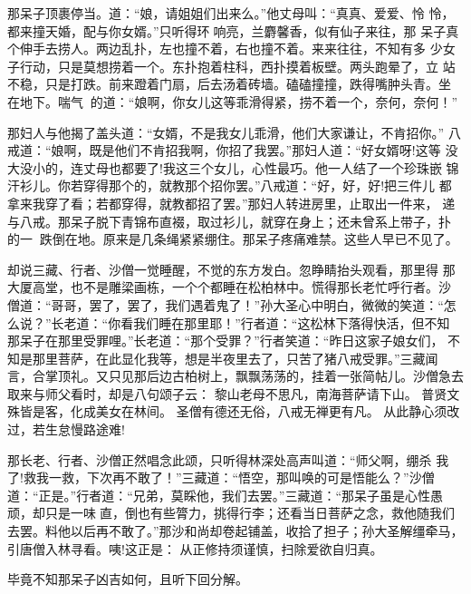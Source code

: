 那呆子顶裹停当。道：“娘，请姐姐们出来么。”他丈母叫：“真真、爱爱、怜
怜，都来撞天婚，配与你女婿。”只听得环响亮，兰麝馨香，似有仙子来往，那
呆子真个伸手去捞人。两边乱扑，左也撞不着，右也撞不着。来来往往，不知有多
少女子行动，只是莫想捞着一个。东扑抱着柱科，西扑摸着板壁。两头跑晕了，立
站不稳，只是打跌。前来蹬着门扇，后去汤着砖墙。磕磕撞撞，跌得嘴肿头青。坐
在地下。喘气的道：“娘啊，你女儿这等乖滑得紧，捞不着一个，奈何，奈何！”

那妇人与他揭了盖头道：“女婿，不是我女儿乖滑，他们大家谦让，不肯招你。”
八戒道：“娘啊，既是他们不肯招我啊，你招了我罢。”那妇人道：“好女婿呀!这等
没大没小的，连丈母也都要了!我这三个女儿，心性最巧。他一人结了一个珍珠嵌
锦汗衫儿。你若穿得那个的，就教那个招你罢。”八戒道：“好，好，好!把三件儿
都拿来我穿了看；若都穿得，就教都招了罢。”那妇人转进房里，止取出一件来，
递与八戒。那呆子脱下青锦布直裰，取过衫儿，就穿在身上；还未曾系上带子，扑
的一，跌倒在地。原来是几条绳紧紧绷住。那呆子疼痛难禁。这些人早已不见了。

却说三藏、行者、沙僧一觉睡醒，不觉的东方发白。忽睁睛抬头观看，那里得
那大厦高堂，也不是雕梁画栋，一个个都睡在松柏林中。慌得那长老忙呼行者。沙
僧道：“哥哥，罢了，罢了，我们遇着鬼了！”孙大圣心中明白，微微的笑道：“怎
么说？”长老道：“你看我们睡在那里耶！”行者道：“这松林下落得快活，但不知
那呆子在那里受罪哩。”长老道：“那个受罪？”行者笑道：“昨日这家子娘女们，
不知是那里菩萨，在此显化我等，想是半夜里去了，只苦了猪八戒受罪。”三藏闻
言，合掌顶礼。又只见那后边古柏树上，飘飘荡荡的，挂着一张简帖儿。沙僧急去
取来与师父看时，却是八句颂子云：
黎山老母不思凡，南海菩萨请下山。
普贤文殊皆是客，化成美女在林间。
圣僧有德还无俗，八戒无禅更有凡。
从此静心须改过，若生怠慢路途难!

那长老、行者、沙僧正然唱念此颂，只听得林深处高声叫道：“师父啊，绷杀
我了!救我一救，下次再不敢了！”三藏道：“悟空，那叫唤的可是悟能么？”沙僧
道：“正是。”行者道：“兄弟，莫睬他，我们去罢。”三藏道：“那呆子虽是心性愚
顽，却只是一味直，倒也有些膂力，挑得行李；还看当日菩萨之念，救他随我们
去罢。料他以后再不敢了。”那沙和尚却卷起铺盖，收拾了担子；孙大圣解缰牵马，
引唐僧入林寻看。咦!这正是：
从正修持须谨慎，扫除爱欲自归真。

毕竟不知那呆子凶吉如何，且听下回分解。